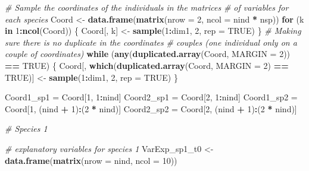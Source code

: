 \documentclass[
]{article}
\newenvironment{Shaded}{\begin{snugshade}}{\end{snugshade}}
\newcommand{\CommentTok}[1]{\textcolor[rgb]{0.56,0.35,0.01}{\textit{#1}}}
\newcommand{\ControlFlowTok}[1]{\textcolor[rgb]{0.13,0.29,0.53}{\textbf{#1}}}
\newcommand{\DataTypeTok}[1]{\textcolor[rgb]{0.13,0.29,0.53}{#1}}
\newcommand{\DecValTok}[1]{\textcolor[rgb]{0.00,0.00,0.81}{#1}}
\newcommand{\KeywordTok}[1]{\textcolor[rgb]{0.13,0.29,0.53}{\textbf{#1}}}
\newcommand{\NormalTok}[1]{#1}
\newcommand{\OperatorTok}[1]{\textcolor[rgb]{0.81,0.36,0.00}{\textbf{#1}}}
\newcommand{\OtherTok}[1]{\textcolor[rgb]{0.56,0.35,0.01}{#1}}
\newcommand{\StringTok}[1]{\textcolor[rgb]{0.31,0.60,0.02}{#1}}
\begin{document}
\begin{Shaded}
\begin{Highlighting}[]
\CommentTok{# Sample the coordinates of the individuals in the matrices}
\CommentTok{# of variables for each species}
\NormalTok{Coord <-}\StringTok{ }\KeywordTok{data.frame}\NormalTok{(}\KeywordTok{matrix}\NormalTok{(}\DataTypeTok{nrow =} \DecValTok{2}\NormalTok{, }\DataTypeTok{ncol =}\NormalTok{ nind }\OperatorTok{*}\StringTok{ }\NormalTok{nsp))}
\ControlFlowTok{for}\NormalTok{ (k }\ControlFlowTok{in} \DecValTok{1}\OperatorTok{:}\KeywordTok{ncol}\NormalTok{(Coord)) \{}
\NormalTok{    Coord[, k] <-}\StringTok{ }\KeywordTok{sample}\NormalTok{(}\DecValTok{1}\OperatorTok{:}\NormalTok{dim1, }\DecValTok{2}\NormalTok{, }\DataTypeTok{rep =} \OtherTok{TRUE}\NormalTok{)}
\NormalTok{\}}
\CommentTok{# Making sure there is no duplicate in the coordinates}
\CommentTok{# couples (one individual only on a couple of coordinates)}
\ControlFlowTok{while}\NormalTok{ (}\KeywordTok{any}\NormalTok{(}\KeywordTok{duplicated.array}\NormalTok{(Coord, }\DataTypeTok{MARGIN =} \DecValTok{2}\NormalTok{)) }\OperatorTok{==}\StringTok{ }\OtherTok{TRUE}\NormalTok{) \{}
\NormalTok{    Coord[, }\KeywordTok{which}\NormalTok{(}\KeywordTok{duplicated.array}\NormalTok{(Coord, }\DataTypeTok{MARGIN =} \DecValTok{2}\NormalTok{) }\OperatorTok{==}\StringTok{ }\OtherTok{TRUE}\NormalTok{)] <-}\StringTok{ }\KeywordTok{sample}\NormalTok{(}\DecValTok{1}\OperatorTok{:}\NormalTok{dim1, }
        \DecValTok{2}\NormalTok{, }\DataTypeTok{rep =} \OtherTok{TRUE}\NormalTok{)}
\NormalTok{\}}

\NormalTok{Coord1_sp1 =}\StringTok{ }\NormalTok{Coord[}\DecValTok{1}\NormalTok{, }\DecValTok{1}\OperatorTok{:}\NormalTok{nind]}
\NormalTok{Coord2_sp1 =}\StringTok{ }\NormalTok{Coord[}\DecValTok{2}\NormalTok{, }\DecValTok{1}\OperatorTok{:}\NormalTok{nind]}
\NormalTok{Coord1_sp2 =}\StringTok{ }\NormalTok{Coord[}\DecValTok{1}\NormalTok{, (nind }\OperatorTok{+}\StringTok{ }\DecValTok{1}\NormalTok{)}\OperatorTok{:}\NormalTok{(}\DecValTok{2} \OperatorTok{*}\StringTok{ }\NormalTok{nind)]}
\NormalTok{Coord2_sp2 =}\StringTok{ }\NormalTok{Coord[}\DecValTok{2}\NormalTok{, (nind }\OperatorTok{+}\StringTok{ }\DecValTok{1}\NormalTok{)}\OperatorTok{:}\NormalTok{(}\DecValTok{2} \OperatorTok{*}\StringTok{ }\NormalTok{nind)]}

\CommentTok{# Species 1}

\CommentTok{# explanatory variables for species 1}
\NormalTok{VarExp_sp1_t0 <-}\StringTok{ }\KeywordTok{data.frame}\NormalTok{(}\KeywordTok{matrix}\NormalTok{(}\DataTypeTok{nrow =}\NormalTok{ nind, }\DataTypeTok{ncol =} \DecValTok{10}\NormalTok{))}


\end{Highlighting}
\end{Shaded}
\end{document}
